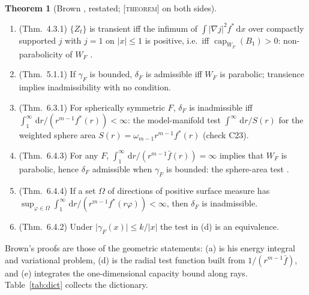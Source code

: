 \documentclass[a4paper,11pt,noarxiv]{quantumarticle}
\newcommand{\abs}[1]{\lvert #1\rvert}
\newcommand{\dd}{\,\mathrm{d}}
\newcommand{\grad}{\nabla}
\newcommand{\fbar}{\bar f}
\DeclareMathOperator{\capa}{cap}
\newcommand{\status}[1]{\textsc{\small [#1]}}
\theoremstyle{plain}
\theoremstyle{definition}
\newtheorem{restatement}[proposition]{Theorem}
\theoremstyle{remark}
\begin{document}
\begin{restatement}[Brown \cite{brown1971}, restated; \status{theorem} on both sides]
\label{thm:brown}\leavevmode
\begin{enumerate}[label=\textup{(\alph*)},leftmargin=1.7em,itemsep=2pt,topsep=2pt]
\item (Thm.\ 4.3.1) $\{Z_t\}$ is transient iff the infimum of
$\int\abs{\grad j}^2f^*\dd x$ over compactly supported $j$ with $j=1$
on $\abs x\le1$ is positive, i.e.\ iff $\capa_{W_F}(B_1)>0$:
non-parabolicity of $W_F$ \cite[Thm.\ 5.1(6)]{grigoryan1999}.
\item (Thm.\ 5.1.1) If $\gamma_F$ is bounded, $\delta_F$ is admissible
iff $W_F$ is parabolic; transience implies inadmissibility with no
condition.
\item (Thm.\ 6.3.1) For spherically symmetric $F$, $\delta_F$ is
inadmissible iff $\int_1^\infty\dd r/(r^{m-1}f^*(r))<\infty$: the
model-manifold test $\int^\infty\dd r/S(r)$
\cite[Prop.\ 3.1]{grigoryan1999} for the weighted sphere area
$S(r)=\omega_{m-1}r^{m-1}f^*(r)$ (check C23).
\item (Thm.\ 6.4.3) For any $F$,
$\int_1^\infty\dd r/(r^{m-1}\fbar(r))=\infty$ implies that $W_F$ is
parabolic, hence $\delta_F$ admissible when $\gamma_F$ is bounded: the
sphere-area test \cite[Thm.\ 7.5]{grigoryan1999}.
\item (Thm.\ 6.4.4) If a set $\Omega$ of directions of positive
surface measure has
$\sup_{\varphi\in\Omega}\int_1^\infty\dd r/(r^{m-1}f^*(r\varphi))<\infty$,
then $\delta_F$ is inadmissible.
\item (Thm.\ 6.4.2) Under $\abs{\gamma_F(x)}\le k/\abs{x}$ the test in
(d) is an equivalence.
\end{enumerate}
\end{restatement}

Brown's proofs are those of the geometric statements: (a) is his
energy integral and variational problem, (d) is the radial test
function built from $1/(r^{m-1}\fbar)$, and (e) integrates the
one-dimensional capacity bound along rays. Table~\ref{tab:dict}
collects the dictionary.
\end{document}
